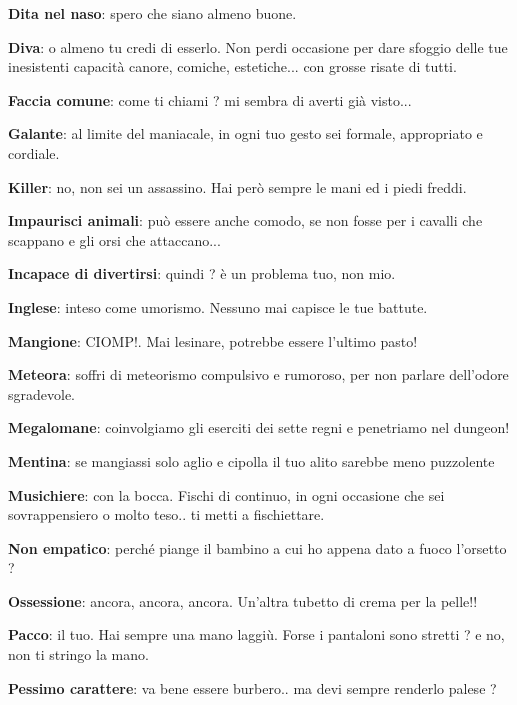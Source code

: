 \documentclass[a4paper,twoside,openany]{book}
\begin{document}
\begin{multicols}{2}
\textbf{Dita nel naso}: spero che siano almeno buone.

\textbf{Diva}: o almeno tu credi di esserlo. Non perdi occasione per dare sfoggio delle tue inesistenti capacità canore, comiche, estetiche... con grosse risate di tutti.

\textbf{Faccia comune}: come ti chiami ? mi sembra di averti già visto...

\textbf{Galante}: al limite del maniacale, in ogni tuo gesto sei formale, appropriato e cordiale.

\textbf{Killer}: no, non sei un assassino. Hai però sempre le mani ed i piedi freddi.

\textbf{Impaurisci animali}: può essere anche comodo, se non fosse per i cavalli che scappano e gli orsi che attaccano...

\textbf{Incapace di divertirsi}: quindi ? è un problema tuo, non mio.

\textbf{Inglese}: inteso come umorismo. Nessuno mai capisce le tue battute.

\textbf{Mangione}: CIOMP!. Mai lesinare, potrebbe essere l'ultimo pasto!

\textbf{Meteora}: soffri di meteorismo compulsivo e rumoroso, per non parlare dell'odore sgradevole.

\textbf{Megalomane}: coinvolgiamo gli eserciti dei sette regni e penetriamo nel dungeon!

\textbf{Mentina}: se mangiassi solo aglio e cipolla il tuo alito sarebbe meno puzzolente

\textbf{Musichiere}: con la bocca. Fischi di continuo, in ogni occasione che sei sovrappensiero o molto teso.. ti metti a fischiettare.

\textbf{Non empatico}: perché piange il bambino a cui ho appena dato a fuoco l'orsetto ?

\textbf{Ossessione}: ancora, ancora, ancora. Un'altra tubetto di crema per la pelle!!

\textbf{Pacco}: il tuo. Hai sempre una mano laggiù. Forse i pantaloni sono stretti ? e no, non ti stringo la mano.

\textbf{Pessimo carattere}: va bene essere burbero.. ma devi sempre renderlo palese ?


\end{multicols}
\end{document}

